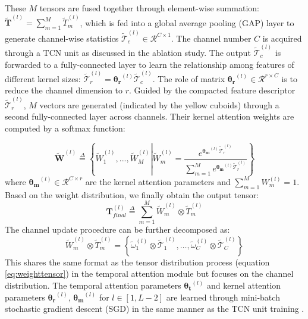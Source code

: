 \documentclass[twocolumn]{svjour3}          \smartqed  \usepackage{graphicx}
\begin{document}
These $M$ tensors are fused together through element-wise summation: $\widetilde{\mathbf{T}}^{(l)} = \sum_{m=1}^M\widetilde{T}^{(l)}_m$, which is fed into a global average pooling (GAP) layer to generate channel-wise statistics $\widetilde{\mathcal{T}}^{(l)}_c \in \mathcal{R}^{C \times 1 }$. The channel number $C$ is acquired through a TCN unit as discussed in the ablation study. The output $\widetilde{\mathcal{T}}^{(l)}_c$ is forwarded to a fully-connected layer to learn the relationship among features of different kernel sizes: $\widetilde{\mathcal{T}}^{(l)}_r = \boldsymbol{\theta_r}^{(l)}\widetilde{\mathcal{T}}^{(l)}_c$. The role of matrix $\boldsymbol{\theta_r}^{(l)} \in \mathcal{R}^{r \times C}$ is to reduce the channel dimension to $r$. Guided by the compacted feature descriptor $\widetilde{\mathcal{T}}^{(l)}_r$, $M$ vectors are generated (indicated by the yellow cuboids) through a second fully-connected layer across channels. Their kernel attention weights are computed by a softmax function:

\begin{equation}
\widetilde{\boldsymbol{W}}^{(l)} \overset{\Delta}{=} \left\{ \widetilde{W}_1^{(l)}, ..., \widetilde{W}_M^{(l)} \left|
\widetilde{W}_m^{(l)} = \frac{e^{\boldsymbol{\theta_m}^{(l)}\widetilde{\mathcal{T}}^{(l)}_r}}{\sum_{m=1}^{M}e^{\boldsymbol{\theta_m}^{(l)}\widetilde{\mathcal{T}}^{(l)}_r}} \right\}\right.
\end{equation}
where $\boldsymbol{\theta_m}^{(l)}\in \mathcal{R}^{C \times r}$ are the kernel attention parameters and $\sum_{m=1}^MW_m^{(l)} =1$. Based on the weight distribution, we finally obtain the output tensor: 
\begin{equation}
    \mathbf{T}_{final}^{(l)} \overset{\Delta}{=} \sum_{m=1}^M \widetilde{W}_m^{(l)} \otimes \widetilde{T}_m^{(l)} 
    \label{eq:T_new}
\end{equation}
The channel update procedure can be further decomposed as:
\begin{equation}
    \widetilde{W}_m^{(l)} \otimes \widetilde{T}_m^{(l)}  = \left\{
    \widetilde{\omega}_1^{(l)} \otimes\widetilde{\mathcal{T}}_1^{(l)}, \dots, \widetilde{\omega}_{C}^{(l)} \otimes\widetilde{\mathcal{T}}_{C}^{(l)} \right\}
\end{equation}
This shares the same format as the tensor distribution process (equation \ref{eq:weighttensor}) in the temporal attention module but focuses on the channel distribution. The temporal attention parameters $\boldsymbol{\theta_t}^{(l)}$ and kernel attention parameters $\boldsymbol{\theta_r}^{(l)}$, $ \boldsymbol{\theta_m}^{(l)} $ for $l \in [1, L-2]$ are learned through mini-batch stochastic gradient descent (SGD) in the same manner as the TCN unit training \citep{bottou2010large}.
\end{document}
